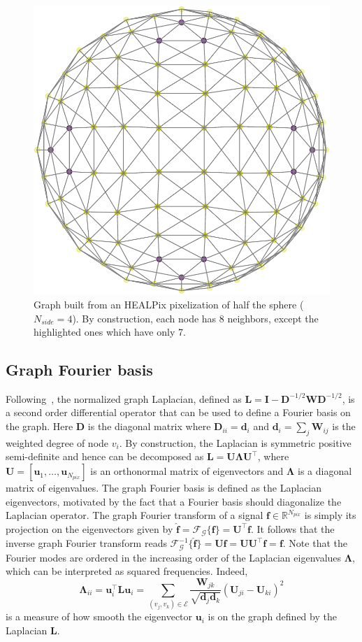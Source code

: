 \documentclass[final,twocolumn,3p,times,authoryear]{elsarticle}
\renewcommand{\b}[1]{{\bm{#1}}}   %
\newcommand{\1}{\b{1}}              %
\newcommand{\0}{\b{0}}              %
\newcommand{\G}{\mathcal{G}}
\newcommand{\E}{\mathcal{E}}
\renewcommand{\L}{\b{L}}
\newcommand{\W}{\b{W}}
\newcommand{\I}{\b{I}}
\newcommand{\D}{\b{D}}
\newcommand{\U}{\b{U}}
\newcommand{\f}{\b{f}}
\newcommand{\trans}{^\intercal}
\newcommand{\R}{\mathbb{R}}
\newcommand{\bLambda}{\b{\Lambda}}
\begin{document}
\begin{figure}
	\centering
	\includegraphics[width=0.8\linewidth]{figures/half_graph_4.pdf}
	\caption[]{Graph built from an HEALPix pixelization of half the sphere ($N_{side} = 4$). By construction, each node has 8 neighbors, except the highlighted ones which have only 7.\footnotemark[6]}
	\label{fig:healpix_graph_4}
\end{figure}

\subsection{Graph Fourier basis}

Following~\cite{shuman2013emerging}, the normalized graph Laplacian,
defined as $\L = \I - \D^{-1/2} \W \D^{-1/2}$, is a second order differential operator
that can be used to define a Fourier basis on the graph. Here $\D$ is the diagonal
matrix where $\D_{ii} = \b{d}_i$ and $\b{d}_i = \sum_j \W_{ij}$ is the weighted degree of node $v_i$. By construction, the Laplacian is symmetric positive
semi-definite and hence can be decomposed as $\L = \U \bLambda \U\trans$, where $\U = [\b u_1, \ldots, \b u_{N_{pix}}]$ is an
orthonormal matrix of eigenvectors and $\bLambda$ is a diagonal matrix of
eigenvalues. The graph Fourier basis is defined as the Laplacian eigenvectors, motivated by the fact that a Fourier basis should diagonalize the Laplacian operator.
The graph Fourier transform of a signal $\f \in \R^{N_{pix}}$ is simply its projection on the eigenvectors given by
$\hat{\f} = \mathcal{F}_\G \{\f\} = \U\trans \f$. It follows that the inverse graph Fourier transform reads $\mathcal{F}^{-1}_\G \{\hat{\f}\} = \U\hat{\f} = \U \U\trans \f = \f$.
Note that the Fourier modes are ordered in the increasing order of the Laplacian eigenvalues $\bLambda$, which can be interpreted as squared frequencies.
Indeed,
\begin{equation*}
	\bLambda_{ii} = \b u_i\trans \L \b u_i = \sum_{(v_j, v_k) \in \E} \frac{\W_{jk}}{\sqrt{\b d_j \b d_k}} (\U_{ji} - \U_{ki})^2
\end{equation*}
is a measure of how smooth the eigenvector $\b u_i$ is on the graph defined by the Laplacian $\L$.
\end{document}
